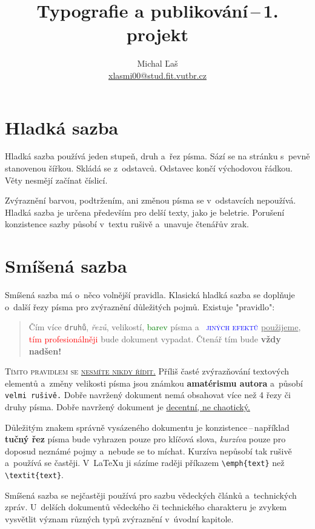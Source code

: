 \documentclass[twocolumn, 10pt, a4paper]{article}
\title{Typografie a publikování\,--\,1. projekt}
\author{Michal Ľaš \\ \href{mailto:xlasmi00@stud.fit.vutbr.cz}{xlasmi00@stud.fit.vutbr.cz}}
\date{} %
\begin{document}
\maketitle


\section{Hladká sazba}

Hladká sazba používá jeden stupeň, druh a~řez písma. 
Sází se na stránku s~pevně stanovenou šířkou.
Skládá se z~odstavců. Odstavec končí východovou řádkou.
Věty nesmějí začínat číslicí.

Zvýraznění barvou, podtržením, ani změnou písma se v~odstavcích nepoužívá.
Hladká sazba je určena především pro delší texty, jako je beletrie.
Porušení konzistence sazby působí v~textu rušivě a~unavuje čtenářův zrak.


\section{Smíšená sazba}

Smíšená sazba má o~něco volnější pravidla.
Klasická hladká sazba se doplňuje o~další řezy písma pro zvýraznění důležitých pojmů.
Existuje "pravidlo":
\begin{quotation}
    Čím více \texttt{druhů}, \emph{řezů}, {\tiny velikostí}, \textcolor{green}{barev} písma a~ \textcolor{blue}{\textsc{jiných efektů}} \underline{použijeme}, \textcolor{red}{tím profesionálněji} bude {\selectfont dokument} vypadat.
    Čtenář tím bude {\Huge \textbf{vždy nadšen!}}
\end{quotation}

\textsc{Tímto pravidlem se \underline{nesmíte nikdy řídit.}}
Příliš časté zvýrazňování textových elementů a~změny velikosti písma jsou známkou \textbf{amatérismu autora} a~působí \texttt{velmi rušivě.}
Dobře navržený dokument nemá obsahovat více než 4 řezy či druhy písma.
Dobře navržený dokument je \underline{decentní, ne chaotický.}

Důležitým znakem správně vysázeného dokumentu je konzistence\,--\,například \textbf{tučný řez} písma bude vyhrazen pouze pro klíčová slova, \emph{kurzíva} pouze pro doposud neznámé pojmy a~nebude se to míchat.
Kurzíva nepůsobí tak rušivě a~používá se častěji.
V~\LaTeX u ji sázíme raději příkazem \verb|\emph{text}| než \verb|\textit{text}|.

Smíšená sazba se nejčastěji používá pro sazbu vědeckých článků a~technických zpráv.
U~delších dokumentů vědeckého či technického charakteru je zvykem vysvětlit význam různých typů zvýraznění v~úvodní kapitole.
\end{document}
